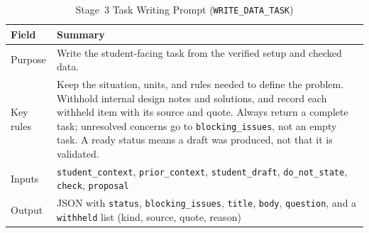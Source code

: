 \begin{table}[!htb]
\centering
\caption[Stage 3 Task Writing Prompt (\texttt{WRITE\_DATA\_TASK})]{Stage~3 Task Writing Prompt (\texttt{WRITE\_DATA\_TASK})}
\label{tab:app-structpf-3-write}
\footnotesize
\setlength{\tabcolsep}{4.5pt}
\renewcommand{\arraystretch}{1.16}
\begin{tabular}{@{} >{\raggedright\arraybackslash}p{} >{\raggedright\arraybackslash}p{} @{}}
\toprule
\textbf{Field} & \textbf{Summary} \\
\midrule
Purpose & Write the student-facing task from the verified setup and checked data. \\
Key rules & Keep the situation, units, and rules needed to define the problem. \newline Withhold internal design notes and solutions, and record each withheld item with its source and quote. \newline Always return a complete task; unresolved concerns go to \texttt{blocking\_issues}, not an empty task. \newline A ready status means a draft was produced, not that it is validated. \\
Inputs & \texttt{student\_context}, \texttt{prior\_context}, \texttt{student\_draft}, \texttt{do\_not\_state}, \texttt{check}, \texttt{proposal} \\
Output & JSON with \texttt{status}, \texttt{blocking\_issues}, \texttt{title}, \texttt{body}, \texttt{question}, and a \texttt{withheld} list (kind, source, quote, reason) \\
\bottomrule
\end{tabular}
\end{table}
